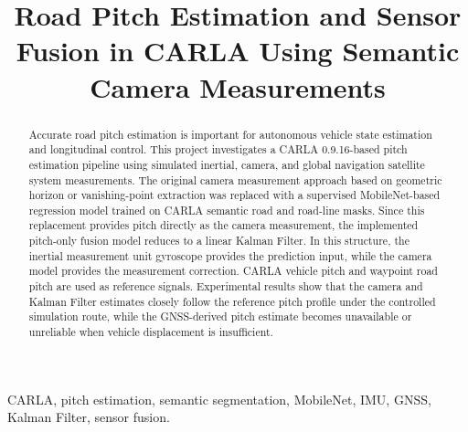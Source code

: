 \documentclass[conference]{IEEEtran}
\begin{document}
\title{Road Pitch Estimation and Sensor Fusion in CARLA Using Semantic Camera Measurements}

\author{
\and
{}
}

\maketitle


\begin{abstract}
Accurate road pitch estimation is important for autonomous vehicle state estimation and longitudinal control. This project investigates a CARLA 0.9.16-based pitch estimation pipeline using simulated inertial, camera, and global navigation satellite system measurements. The original camera measurement approach based on geometric horizon or vanishing-point extraction was replaced with a supervised MobileNet-based regression model trained on CARLA semantic road and road-line masks. Since this replacement provides pitch directly as the camera measurement, the implemented pitch-only fusion model reduces to a linear Kalman Filter. In this structure, the inertial measurement unit gyroscope provides the prediction input, while the camera model provides the measurement correction. CARLA vehicle pitch and waypoint road pitch are used as reference signals. Experimental results show that the camera and Kalman Filter estimates closely follow the reference pitch profile under the controlled simulation route, while the GNSS-derived pitch estimate becomes unavailable or unreliable when vehicle displacement is insufficient.
\end{abstract}

\begin{IEEEkeywords}
CARLA, pitch estimation, semantic segmentation, MobileNet, IMU, GNSS, Kalman Filter, sensor fusion.
\end{IEEEkeywords}

\end{document}

